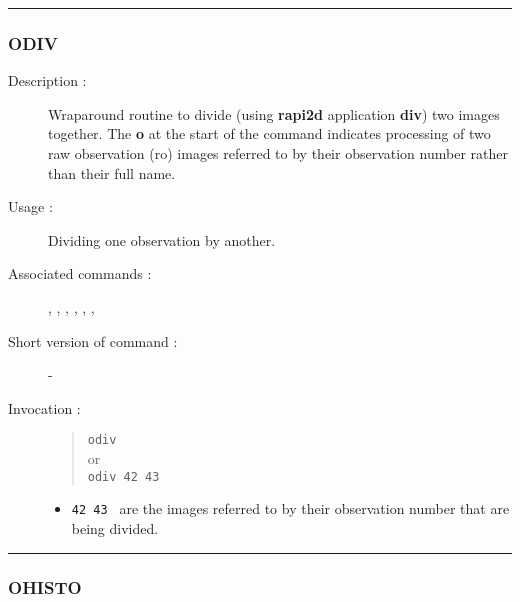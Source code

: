 \hrule 
\subsubsection*{\label{ODIV}ODIV}

\begin{description}

\item[Description :] Wraparound routine to divide (using {\bf rapi2d}
application {\bf div}) two images together. The {\bf o} at the start of
the command indicates processing of two raw observation ({\sc ro})
images referred to by their observation number rather than their full
name.

\item[Usage :] Dividing one observation by another.

\item[Associated commands :] {\tt {}}, 
{\tt {}}, {\tt {}}, 
{\tt {}}, {\tt {}}, 
{\tt {}}, {\tt {}}

\item[Short version of command :] -
\item[Invocation :]

\begin{quote}{\tt  odiv }\\
or \\
{\tt odiv 42 43 }
\end{quote}

\begin{itemize}

\item {\tt 42 43 } are the images referred to by their observation number
 that are being divided.
\end{itemize}

\end{description}

\hrule 
\subsubsection*{\label{OHISTO}OHISTO}

